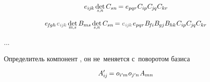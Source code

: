 \[
e_{i\hspace{-0.1ex}j\hspace{-0.1ex}k} \hspace{.33ex} \underset{\raisebox{.15em}{\scalebox{.7}{$s$,$n$}}}{\operatorname{det}} \, C_{sn} \hspace{-0.2ex}
= e_{pqr} \hspace{.1ex} C_{ip} C_{\hspace{-0.1ex}j\hspace{-0.1ex}q} C_{kr}
\hspace{-0.2ex}
\]

\[
e_{\hspace{-0.25ex}f\hspace{-0.2ex}gh} \hspace{.2ex} \mathcolor{black!66}{e_{i\hspace{-0.1ex}j\hspace{-0.1ex}k}} \hspace{.33ex} \underset{\raisebox{.15em}{\scalebox{.7}{$m$,$s$}}}{\operatorname{det}} \, B_{ms} \hspace{.33ex} \underset{\raisebox{.15em}{\scalebox{.7}{$s$,$n$}}}{\operatorname{det}} \, C_{sn} \hspace{-0.2ex}
= \mathcolor{black!66}{e_{i\hspace{-0.1ex}j\hspace{-0.1ex}k}} \hspace{.2ex} e_{pqr} \hspace{.1ex} B_{\hspace{-0.25ex}f\hspace{-0.1ex}i} B_{\hspace{-0.1ex}gj} B_{hk} \hspace{.1ex} C_{ip} C_{\hspace{-0.1ex}j\hspace{-0.1ex}q} C_{kr}
\hspace{-0.2ex}
\]

...

\begin{otherlanguage}{russian}

Определитель
компонент
,
он
не~меняется
с~поворотом базиса

\end{otherlanguage}

\nopagebreak\vspace{-0.2em}\begin{equation*}
A'_{i\hspace{-0.1ex}j} \hspace{-0.16ex} = o_{i'\hspace{-0.1ex}m} \hspace{.1ex} o_{j'\hspace{-0.1ex}n} \hspace{.16ex} A_{mn}
\end{equation*}

